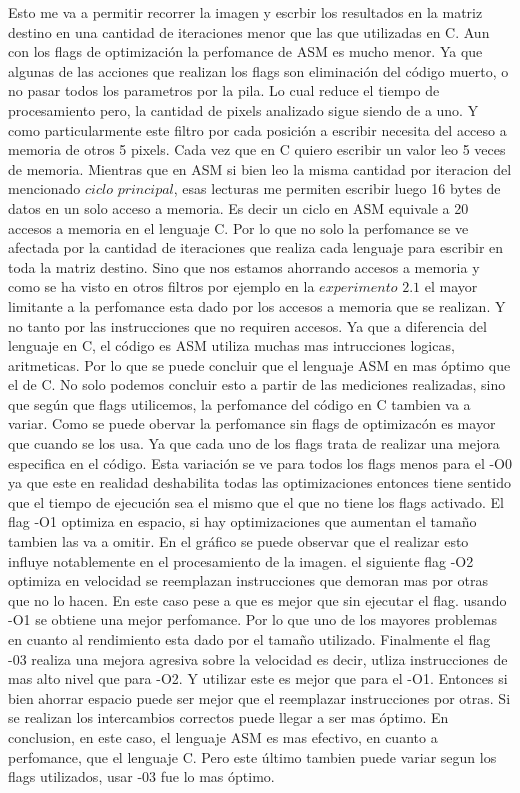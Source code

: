 \documentclass[a4paper]{article}
\begin{document}
Esto me va a permitir recorrer la imagen y escrbir los resultados en la matriz destino en una cantidad de iteraciones menor que las que utilizadas en C. Aun con los flags de optimización la perfomance de ASM es mucho menor. Ya que algunas de las acciones que realizan los flags son eliminación del código muerto, o no pasar todos los parametros por la pila. Lo cual reduce el tiempo de procesamiento pero, la cantidad de pixels analizado sigue siendo de a uno. Y como particularmente este filtro por cada posición a escribir necesita del acceso a memoria de otros 5 pixels. Cada vez que en C quiero escribir un valor leo 5 veces de memoria. Mientras que en ASM si bien leo la misma cantidad por iteracion del mencionado $ciclo$ $principal$, esas lecturas me permiten escribir luego 16 bytes de datos en un solo acceso a memoria. Es decir un ciclo en ASM equivale a 20 accesos a memoria en el lenguaje C. Por lo que no solo la perfomance se ve afectada por la cantidad de iteraciones que realiza cada lenguaje para escribir en toda la matriz destino. Sino que nos estamos ahorrando accesos a memoria y como se ha visto  en otros filtros por ejemplo en la $experimento$ $2.1$ el mayor limitante a la perfomance esta dado por los accesos a memoria que se realizan. Y no tanto por las instrucciones que no requiren accesos. Ya que a diferencia del lenguaje en C, el código es ASM utiliza muchas mas intrucciones logicas, aritmeticas. Por lo que se puede concluir que el lenguaje ASM en mas óptimo que el de C. No solo podemos concluir esto a partir de las mediciones realizadas, sino que según que flags utilicemos, la perfomance del código en C tambien va a variar. Como se puede obervar la perfomance sin flags de optimizacón es mayor que cuando se los usa. Ya que cada uno de los flags trata de realizar una mejora especifica en el código. Esta variación se ve para todos los flags menos para el -O0 ya que este en realidad deshabilita todas las optimizaciones entonces tiene sentido que el tiempo de ejecución sea el mismo que el que no tiene los flags activado. El flag -O1    
optimiza en espacio, si hay optimizaciones que aumentan el tamaño tambien las va a omitir. En el gráfico se puede observar que el realizar esto influye notablemente en el procesamiento de la imagen. el siguiente flag -O2 optimiza en velocidad se reemplazan instrucciones que demoran mas por otras que no lo hacen. En este caso pese a que es mejor que sin ejecutar el flag. usando -O1 se obtiene una mejor perfomance. Por lo que uno de los mayores problemas en cuanto al rendimiento esta dado por el tamaño utilizado. Finalmente el flag -03 realiza una mejora agresiva sobre la velocidad es decir, utliza instrucciones de mas alto nivel que para -O2. Y utilizar este es mejor que para el -O1. Entonces si bien ahorrar espacio puede ser mejor que el reemplazar instrucciones por otras. Si se realizan los intercambios correctos puede llegar a ser mas óptimo. En conclusion, en este caso, el lenguaje ASM es mas efectivo, en cuanto a perfomance, que el lenguaje C. Pero este último tambien puede variar segun los flags utilizados, usar -03 fue lo mas óptimo. 
\end{document}
